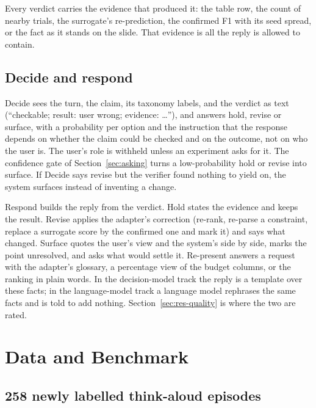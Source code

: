 \documentclass[preprint,12pt,3p,times]{elsarticle}
\begin{document}
Every verdict carries the evidence that produced it: the table row, the count of nearby trials, the surrogate's re-prediction, the confirmed F1 with its seed spread, or the fact as it stands on the slide. That evidence is all the reply is allowed to contain.

\subsection{Decide and respond}
\label{sec:decide}

Decide sees the turn, the claim, its taxonomy labels, and the verdict as text (``checkable; result: user wrong; evidence: \ldots''), and answers hold, revise or surface, with a probability per option and the instruction that the response depends on whether the claim could be checked and on the outcome, not on who the user is. The user's role is withheld unless an experiment asks for it. The confidence gate of Section~\ref{sec:asking} turns a low-probability hold or revise into surface. If Decide says revise but the verifier found nothing to yield on, the system surfaces instead of inventing a change.

Respond builds the reply from the verdict. Hold states the evidence and keeps the result. Revise applies the adapter's correction (re-rank, re-parse a constraint, replace a surrogate score by the confirmed one and mark it) and says what changed. Surface quotes the user's view and the system's side by side, marks the point unresolved, and asks what would settle it. Re-present answers a request with the adapter's glossary, a percentage view of the budget columns, or the ranking in plain words. In the decision-model track the reply is a template over these facts; in the language-model track a language model rephrases the same facts and is told to add nothing. Section~\ref{sec:res-quality} is where the two are rated.

\section{Data and Benchmark}
\label{sec:data}

\subsection{258 newly labelled think-aloud episodes}
\label{sec:data258}
\end{document}
